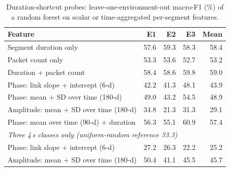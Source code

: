 \begin{table}[t]
\caption{Duration-shortcut probes: leave-one-environment-out macro-F1 (\%) of a random forest on scalar or time-aggregated per-segment features.}
\label{tab:probe}
\centering\footnotesize
\setlength{\tabcolsep}{3pt}
\begin{tabular}{lrrrr}
\toprule
Feature & E1 & E2 & E3 & Mean\\
\midrule
Segment duration only & 57.6 & 59.3 & 58.3 & 58.4\\
Packet count only & 53.3 & 53.6 & 52.7 & 53.2\\
Duration + packet count & 58.4 & 58.6 & 59.8 & 59.0\\
Phase: link slope + intercept (6-d) & 42.2 & 41.3 & 48.1 & 43.9\\
Phase: mean + SD over time (180-d) & 49.0 & 43.2 & 54.5 & 48.9\\
Amplitude: mean + SD over time (180-d) & 34.8 & 21.3 & 31.3 & 29.1\\
Phase: mean over time (90-d) + duration & 56.3 & 55.1 & 60.9 & 57.4\\
\midrule
\multicolumn{5}{l}{\textit{Three 4\,s classes only (uniform-random reference 33.3)}}\\
Phase: link slope + intercept (6-d) & 27.2 & 26.3 & 22.2 & 25.2\\
Amplitude: mean + SD over time (180-d) & 50.4 & 41.1 & 45.5 & 45.7\\
\bottomrule
\end{tabular}
\end{table}

